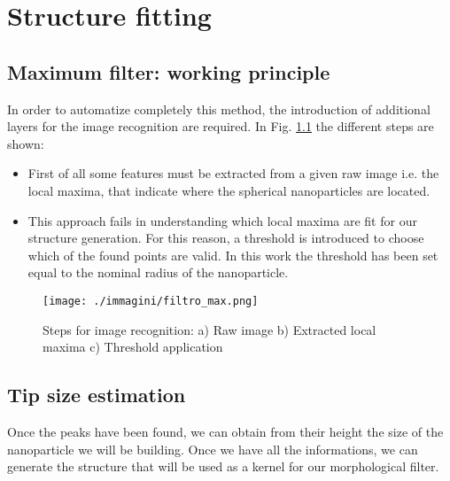 \chapter{Structure fitting}

\section{Maximum filter: working principle}

In order to automatize completely this method, the introduction of additional layers for the image recognition are required. In Fig. \ref{fig:local_max} the different steps are shown:

\begin{itemize}
    \item First of all some features must be extracted from a given raw image i.e. the local maxima, that indicate where the spherical nanoparticles are located.
    \item This approach fails in understanding which local maxima are fit for our structure generation. For this reason, a threshold is introduced to choose which of the found points are valid. In this work the threshold has been set equal to the nominal radius of the nanoparticle.
\end{itemize}

\begin{figure}[ht]
    \centering
    \texttt{[image: ./immagini/filtro\_max.png]}
    \caption{Steps for image recognition: a) Raw image b) Extracted local maxima c) Threshold application}
    \label{fig:local_max}
\end{figure}

\section{Tip size estimation}

Once the peaks have been found, we can obtain from their height the size of the nanoparticle we will be building. Once we have all the informations, we can generate the structure that will be used as a kernel for our morphological filter.

